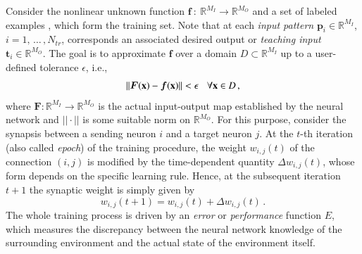 \documentclass{elsarticle}
\numberwithin{equation}{section}
\theoremstyle{theorem}
\theoremstyle{definition}
\theoremstyle{remark}
\theoremstyle{proposition}
\numberwithin{figure}{section}
\newcommand{\bg}[1]{\boldsymbol{#1}}
\begin{document}
		Consider the nonlinear unknown function $\bg{f} ~ : ~ \mathbb{R}^{M_I} \rightarrow \mathbb{R}^{M_O}$ 
		and a set of labeled examples \smash{$\big\lbrace \mathbf{p}_i, \mathbf{t}_i = \bg{f}(\mathbf{p}_i)\big\rbrace_{1 \leq i \leq N_{tr}}$}, which form the training set. Note that at each \emph{input pattern} $\mathbf{p}_i \in \mathbb{R}^{M_I}$, $i = 1, \, \ldots \, , N_{tr}$, corresponds an associated desired output or \emph{teaching input} $\mathbf{t}_i \in \mathbb{R}^{M_O}$. The goal is to approximate $\bg{f}$ over a domain $D \subset \mathbb{R}^{M_I}$ up to a user-defined tolerance $\epsilon$, i.e.,
		\begin{equation*}
			||\bg{F}(\mathbf{x}) - \boldsymbol{f}(\mathbf{x})|| < \epsilon \hspace*{0.3cm} \text{$\forall \mathbf{x} \in D$} \, ,
		\end{equation*}
		where $\bg{F} : \mathbb{R}^{M_I} \rightarrow \mathbb{R}^{M_O}$ is the actual input-output map established by the neural network and $||\cdot||$ is some suitable norm on $\mathbb{R}^{M_O}$. %
		For this purpose, consider the synapsis between a sending neuron $i$ and a target neuron $j$. At the $t$-th iteration (also called \emph{epoch}) of the training procedure, the weight $w_{i,j}(t)$ of the connection $(i,j)$ is modified by the time-dependent quantity $\Delta w_{i,j}(t)$, whose form depends on the specific learning rule. Hence, at the subsequent iteration $t+1$ the synaptic weight is simply given by
		\begin{equation*}
			\label{eq:weight-update}
			w_{i,j}(t+1) = w_{i,j}(t) + \Delta w_{i,j}(t) \, .
		\end{equation*}
		The whole training process is driven by an \emph{error} or \emph{performance} function $E$, which measures the discrepancy between the neural network knowledge of the surrounding environment and the actual state of the environment itself. %
\end{document}
